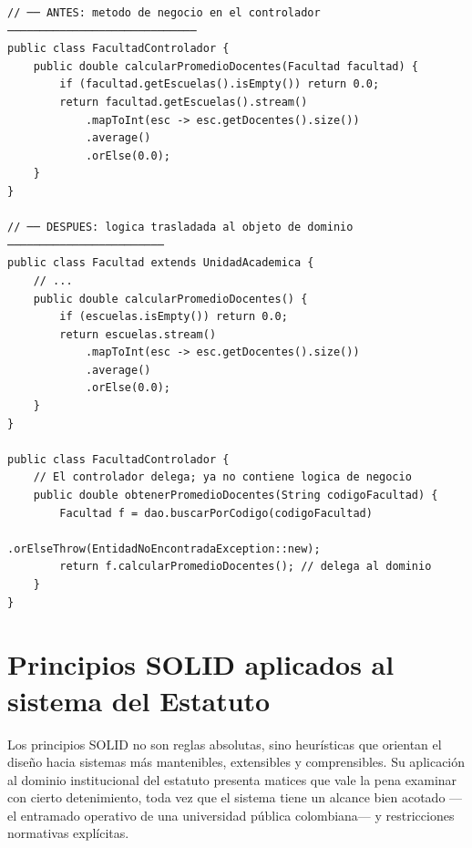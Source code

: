 \begin{lstlisting}[style=javaStyle,
  caption={\textit{Move Method} en \java: traslado de lógica al dominio.},
  label={lst:refact-move-method-java}]
// ── ANTES: metodo de negocio en el controlador ─────────────────────────────
public class FacultadControlador {
    public double calcularPromedioDocentes(Facultad facultad) {
        if (facultad.getEscuelas().isEmpty()) return 0.0;
        return facultad.getEscuelas().stream()
            .mapToInt(esc -> esc.getDocentes().size())
            .average()
            .orElse(0.0);
    }
}

// ── DESPUES: logica trasladada al objeto de dominio ────────────────────────
public class Facultad extends UnidadAcademica {
    // ...
    public double calcularPromedioDocentes() {
        if (escuelas.isEmpty()) return 0.0;
        return escuelas.stream()
            .mapToInt(esc -> esc.getDocentes().size())
            .average()
            .orElse(0.0);
    }
}

public class FacultadControlador {
    // El controlador delega; ya no contiene logica de negocio
    public double obtenerPromedioDocentes(String codigoFacultad) {
        Facultad f = dao.buscarPorCodigo(codigoFacultad)
                        .orElseThrow(EntidadNoEncontradaException::new);
        return f.calcularPromedioDocentes(); // delega al dominio
    }
}
\end{lstlisting}


\section{Principios SOLID aplicados al sistema del Estatuto}
\label{sec:solid}

Los principios SOLID \parencite{Martin2017} no son reglas absolutas, sino heurísticas que
orientan el diseño hacia sistemas más mantenibles, extensibles y comprensibles. Su aplicación
al dominio institucional del estatuto presenta matices que vale la pena examinar con cierto
detenimiento, toda vez que el sistema tiene un alcance bien acotado ---el entramado operativo
de una universidad pública colombiana--- y restricciones normativas explícitas.


